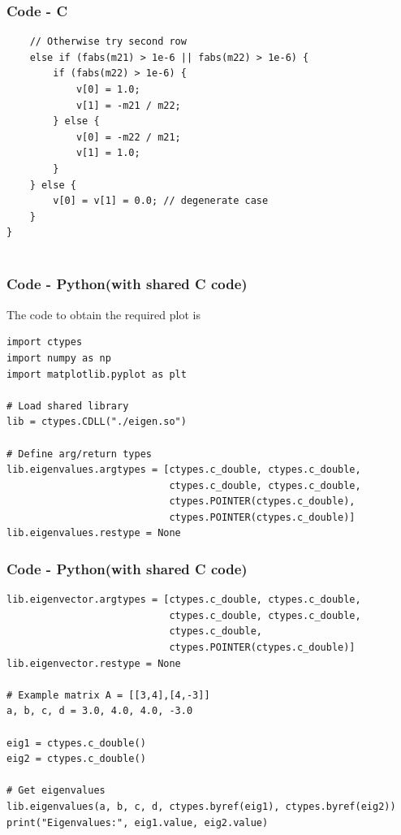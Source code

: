 \documentclass{beamer}
\theoremstyle{remark}
\numberwithin{equation}{section}
\begin{document}
        \begin{frame}[fragile]
    \frametitle{Code - C}
    \begin{lstlisting}
    // Otherwise try second row
    else if (fabs(m21) > 1e-6 || fabs(m22) > 1e-6) {
        if (fabs(m22) > 1e-6) {
            v[0] = 1.0;
            v[1] = -m21 / m22;
        } else {
            v[0] = -m22 / m21;
            v[1] = 1.0;
        }
    } else {
        v[0] = v[1] = 0.0; // degenerate case
    }
}


    \end{lstlisting}
    \end{frame}

\begin{frame}[fragile]
    \frametitle{Code - Python(with shared C code)}
    The code to obtain the required plot is
    \begin{lstlisting}
import ctypes
import numpy as np
import matplotlib.pyplot as plt

# Load shared library
lib = ctypes.CDLL("./eigen.so")

# Define arg/return types
lib.eigenvalues.argtypes = [ctypes.c_double, ctypes.c_double,
                            ctypes.c_double, ctypes.c_double,
                            ctypes.POINTER(ctypes.c_double),
                            ctypes.POINTER(ctypes.c_double)]
lib.eigenvalues.restype = None

\end{lstlisting}
\end{frame}
\begin{frame}[fragile]
\frametitle{Code - Python(with shared C code)}
\begin{lstlisting}
lib.eigenvector.argtypes = [ctypes.c_double, ctypes.c_double,
                            ctypes.c_double, ctypes.c_double,
                            ctypes.c_double,
                            ctypes.POINTER(ctypes.c_double)]
lib.eigenvector.restype = None

# Example matrix A = [[3,4],[4,-3]]
a, b, c, d = 3.0, 4.0, 4.0, -3.0

eig1 = ctypes.c_double()
eig2 = ctypes.c_double()

# Get eigenvalues
lib.eigenvalues(a, b, c, d, ctypes.byref(eig1), ctypes.byref(eig2))
print("Eigenvalues:", eig1.value, eig2.value)



\end{lstlisting}
\end{frame}
\end{document}
